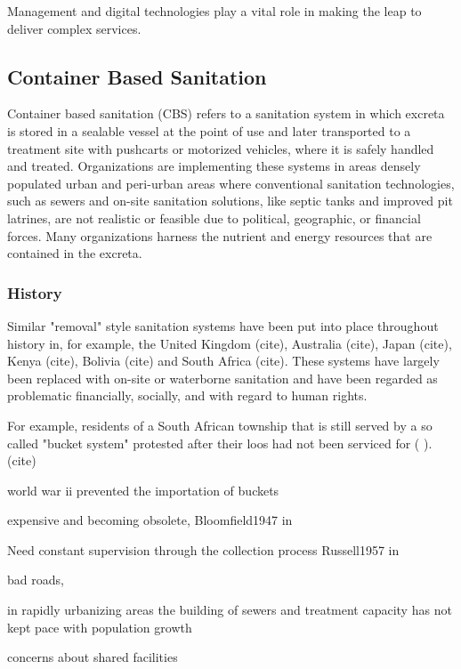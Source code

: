 \documentclass[sustainability,article,submit,moreauthors,pdftex,10pt,a4paper]{mdpi}
\theoremstyle{mdpi}
\newcounter{ex}
\newcounter{re}
\theoremstyle{mdpidefinition}
\begin{document}
Management and digital technologies play a vital role in making the leap to deliver complex services. 
\subsection{Container Based Sanitation}

Container based sanitation (CBS) refers to a sanitation system in which excreta is stored in a sealable vessel at the point of use and later transported to a treatment site with pushcarts or motorized vehicles, where it is safely handled and treated. Organizations are implementing these systems in areas densely populated urban and peri-urban areas where conventional sanitation technologies, such as sewers and on-site sanitation solutions, like septic tanks and improved pit latrines, are not realistic or feasible due to political, geographic, or financial forces. Many organizations harness the nutrient and energy resources that are contained in the excreta. 


 
\subsubsection{History}

Similar "removal" style sanitation systems have been put into place throughout history in, for example, the United Kingdom (cite), Australia (cite), Japan (cite), Kenya  (cite), Bolivia (cite) and South Africa (cite). These systems have largely been replaced with on-site or waterborne sanitation and have been regarded as problematic financially, socially, and with regard to human rights. 

For example, residents of a South African township that is still served by a so called "bucket system" protested after their loos had not been serviced for (   ). (cite)

world war ii prevented the importation of buckets

expensive and becoming obsolete, Bloomfield1947 in \cite{Nyanchaga2007}

Need constant supervision through the collection process Russell1957 in \cite{Nyanchaga2007}

bad roads, 



in rapidly urbanizing areas the building of sewers and treatment capacity has not kept pace with population growth 


concerns about shared facilities
\end{document}
